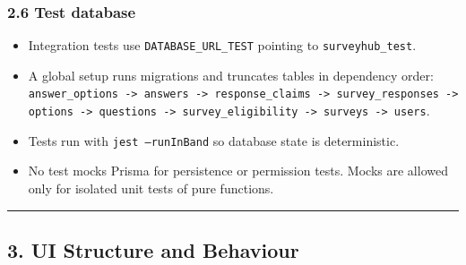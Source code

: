 \documentclass[12pt,a4paper]{article}
\begin{document}
\subsubsection*{2.6 Test database}
\begin{itemize}[leftmargin=*]
\item Integration tests use \texttt{DATABASE\_URL\_TEST} pointing to \texttt{surveyhub\_test}.
\item A global setup runs migrations and truncates tables in dependency order: \texttt{answer\_options -> answers -> response\_claims -> survey\_responses -> options -> questions -> survey\_eligibility -> surveys -> users}.
\item Tests run with \texttt{jest --runInBand} so database state is deterministic.
\item No test mocks Prisma for persistence or permission tests. Mocks are allowed only for isolated unit tests of pure functions.
\end{itemize}

\medskip\noindent\rule{\linewidth}{0.4pt}\medskip

\subsection*{3. UI Structure and Behaviour}
\end{document}
